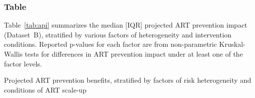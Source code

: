 \subsubsection{Table}
Table~\ref{tab:api} summarizes the median [IQR] projected ART prevention impact (Dataset~B),
stratified by various factors of heterogeneity and intervention conditions.
Reported p-values for each factor are from non-parametric Kruskal-Wallis tests
for differences in ART prevention impact under at least one of the factor levels.
\begin{table}[H]
  \caption{Projected ART prevention benefits,
    stratified by factors of risk heterogeneity and conditions of ART scale-up}
  \centering
  
  \label{tab:api}
\end{table}